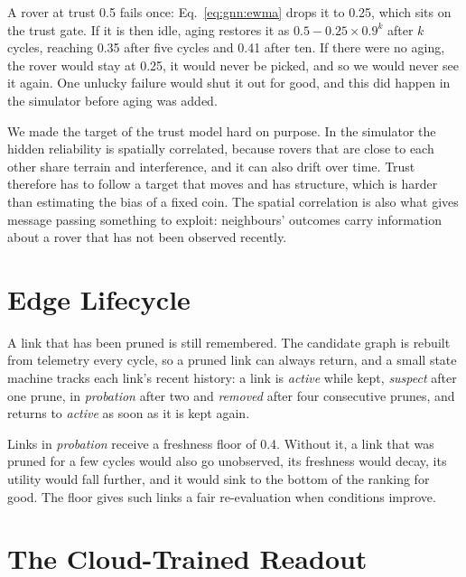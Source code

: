 \begin{example}
A rover at trust 0.5 fails once: Eq.~\eqref{eq:gnn:ewma} drops it to 0.25,
which sits on the trust gate. If it is then idle, aging restores it as
$0.5-0.25\times0.9^k$ after $k$ cycles, reaching 0.35 after five cycles and
0.41 after ten. If there were no aging, the rover would stay at 0.25, it would
never be picked, and so we would never see it again. One unlucky failure would
shut it out for good, and this did happen in the simulator before aging was
added.
\end{example}

We made the target of the trust model hard on purpose. In the simulator the
hidden reliability is spatially correlated, because rovers that are close to
each other share terrain and interference, and it can also drift over time.
Trust therefore has to follow a target that moves and has structure, which is
harder than estimating the bias of a fixed coin. The spatial
correlation is also what gives message passing something to exploit:
neighbours' outcomes carry information about a rover that has not been
observed recently.

\section{Edge Lifecycle}

A link that has been pruned is still remembered. The candidate graph is rebuilt from
telemetry every cycle, so a pruned link can always return, and a small state
machine tracks each link's recent history: a link is \emph{active} while kept,
\emph{suspect} after one prune, in \emph{probation} after two and
\emph{removed} after four consecutive prunes, and returns to \emph{active} as
soon as it is kept again.



Links in \emph{probation} receive a freshness floor of 0.4. Without it, a
link that was pruned for a few cycles would also go unobserved, its freshness
would decay, its utility would fall further, and it would sink to the bottom
of the ranking for good. The floor gives such links a fair re-evaluation
when conditions improve.

\section{The Cloud-Trained Readout}
\label{sec:gnn:readout}

